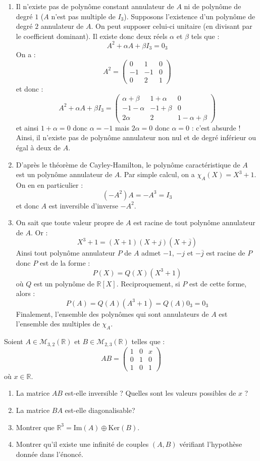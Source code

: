 \documentclass[a4paper,10pt]{report}
\begin{document}
\corr \begin{enumerate}
\item Il n'existe pas de polynôme constant annulateur de $A$ ni de polynôme de degré $1$ ($A$ n'est pas multiple de $I_3$). Supposons l'existence d'un polynôme de degré $2$ annulateur de $A$. On peut supposer celui-ci unitaire (en divisant par le coefficient dominant). Il existe donc deux réels $\alpha$ et $\beta$ tels que :
$$ A^2 + \alpha A + \beta I_3 = 0_3$$
On a :
$$ A^2 = \begin{pmatrix}
0 & 1 & 0 \\
-1 & -1 & 0 \\
0 & 2 & 1 
\end{pmatrix}$$
et donc :
$$ A^2+ \alpha A + \beta I_3 = \begin{pmatrix}
\alpha+ \beta & 1+ \alpha & 0 \\
-1- \alpha & -1+ \beta & 0 \\
2 \alpha & 2 & 1  - \alpha + \beta
\end{pmatrix}$$
et ainsi $1+ \alpha = 0$ donc $\alpha =-1$ mais $2 \alpha = 0$ donc $\alpha = 0$ : c'est absurde ! Ainsi, il n'existe pas de polynôme annulateur non nul et de degré inférieur ou égal à deux de $A$.
\item D'après le théorème de Cayley-Hamilton, le polynôme caractéristique de $A$ est un polynôme annulateur de $A$. Par simple calcul, on a $\chi_A(X) = X^3+1$. On en en particulier :
$$ (-A^2)A= -A^3 = I_3$$
et donc $A$ est inversible d'inverse $-A^2$.
\item On sait que toute valeur propre de $A$ est racine de tout polynôme annulateur de $A$. Or :
$$ X^3+1 = (X+1) (X+j)(X+ \overline{j})$$
Ainsi tout polynôme annulateur $P$ de $A$ admet $-1$, $-j$ et $- \overline{j}$ est racine de $P$ donc $P$ est de la forme :
$$ P(X)= Q(X) (X^3+1)$$
où $Q$ est un polynôme de $\mathbb{R}[X]$. Reciproquement, si $P$ est de cette forme, alors :
$$ P(A) = Q(A)(A^3+1) = Q(A) 0_3 = 0_3$$
Finalement, l'ensemble des polynômes qui sont annulateurs de $A$ est l'ensemble des multiples de $\chi_A$.
\end{enumerate}

\begin{Exa} Soient $A \in \mathcal{M}_{3,2}(\mathbb{R})$ et $B \in \mathcal{M}_{2,3}(\mathbb{R})$ telles que :
$$ AB = \begin{pmatrix}
1 & 0 & x \\
0 & 1 & 0 \\
1 & 0 & 1 
\end{pmatrix}$$
où $x \in \mathbb{R}$.
\begin{enumerate}
\item La matrice $AB$ est-elle inversible ? Quelles sont les valeurs possibles de $x$ ?
\item La matrice $BA$ est-elle diagonalisable?
\item Montrer que $\mathbb{R}^3 = \textrm{Im}(A) \oplus \textrm{Ker}(B)$.
\item Montrer qu'il existe une infinité de couples $(A,B)$ vérifiant l'hypothèse donnée dans l'énoncé.
\end{enumerate}
\end{Exa}
\end{document}
